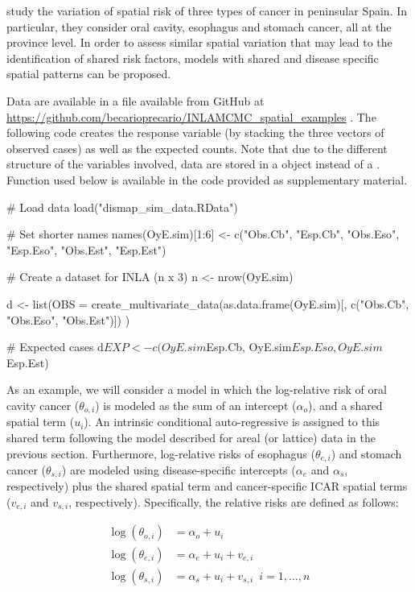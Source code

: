 \cite{GomezRubioPalmiPerales:2018} study the variation of spatial risk of three types of cancer in peninsular Spain. In particular, they consider oral cavity, esophagus and stomach cancer, all at the province level. In order to assess similar spatial variation that may lead to the identification of shared risk factors, models with shared and disease specific spatial patterns can be proposed.

Data are available in a  file available from GitHub at \url{https://github.com/becarioprecario/INLAMCMC_spatial_examples} \cite[see][for details]{GomezRubioPalmiPerales:2018}. The following code creates the response variable (by stacking the three vectors of observed cases) as well as the expected counts. Note that due to the different structure of the variables involved, data are stored in a  object instead of a . Function  used below is available in the code provided as supplementary material. 

\begin{example*}
# Load data
load("dismap_sim_data.RData")

# Set shorter names
names(OyE.sim)[1:6] <- c("Obs.Cb", "Esp.Cb", "Obs.Eso", "Esp.Eso", "Obs.Est", "Esp.Est")

# Create a dataset for INLA (n x 3)
n <- nrow(OyE.sim)

d <- list(OBS = 
  create_multivariate_data(as.data.frame(OyE.sim)[, c("Obs.Cb", "Obs.Eso", "Obs.Est")])
)


# Expected cases
d$EXP <- c(OyE.sim$Esp.Cb, OyE.sim$Esp.Eso, OyE.sim$Esp.Est)
\end{example*}


As an example, we will consider a model in which the log-relative risk of oral cavity cancer ($\theta_{o,i}$) is modeled as the sum of an intercept ($\alpha_{o}$), and a shared spatial term ($u_i$). An intrinsic conditional auto-regressive \citep[ICAR,][]{banerjee2014hierarchical} is assigned to this shared term following the model described for areal (or lattice) data in the previous section. Furthermore, log-relative risks of esophagus ($\theta_{e,i}$) and stomach cancer ($\theta_{s,i}$) are modeled using disease-specific intercepts ($\alpha_e$ and $\alpha_s$, respectively) plus the shared spatial term and cancer-specific ICAR spatial terms ($v_{e,i}$ and $v_{s,i}$, respectively). Specifically, the relative risks are defined as follows: 

\begin{align*}
\log(\theta_{o,i}) &= \alpha_{o} + u_i  \\
\log(\theta_{e,i})  &= \alpha_e + u_i + v_{e,i}\\
\log(\theta_{s,i})  &= \alpha_s + u_i + v_{s,i}  \, \,\, i=1,\ldots, n\nonumber
\end{align*}

